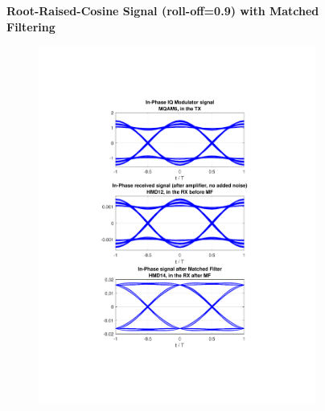 \begin{refsection}
\begin{figure}[H]
	\textbf{Root-Raised-Cosine Signal (roll-off=0.9) with Matched Filtering}
	\begin{minipage}{\linewidth}
		\centering
	\begin{subfigure}{.45\textwidth}
		\centering
		\includegraphics[clip, trim=4cm 4cm 4cm 4cm,
			width=\textwidth]{./sdf/m_qam_system/figures/eyes/simulRrc09Sp60Np00_i.pdf}
	\end{subfigure}
	\begin{subfigure}{.45\textwidth}
		\centering

\end{subfigure}
\end{minipage}
\end{figure}
\end{refsection}
